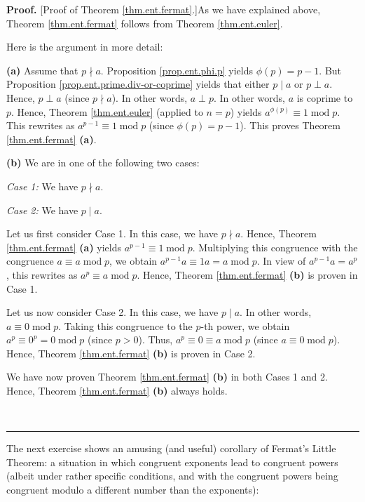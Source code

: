 \documentclass[numbers=enddot,12pt,final,onecolumn,notitlepage]{scrartcl}%
\newcounter{exer}
\numberwithin{exer}{subsection}
\theoremstyle{definition}
\newenvironment{fineprint}{\begin{small}}{\end{small}}
\newenvironment{proof}[1][Proof]{\noindent\textbf{#1.} }{\ \rule{0.5em}{0.5em}}
\begin{document}
\begin{proof}
[Proof of Theorem \ref{thm.ent.fermat}.]As we have explained above, Theorem
\ref{thm.ent.fermat} follows from Theorem \ref{thm.ent.euler}.

\begin{fineprint}
Here is the argument in more detail:

\textbf{(a)} Assume that $p\nmid a$. Proposition \ref{prop.ent.phi.p} yields
$\phi\left(  p\right)  =p-1$. But Proposition
\ref{prop.ent.prime.div-or-coprime} yields that either $p\mid a$ or $p\perp
a$. Hence, $p\perp a$ (since $p\nmid a$). In other words, $a\perp p$. In other
words, $a$ is coprime to $p$. Hence, Theorem \ref{thm.ent.euler} (applied to
$n=p$) yields $a^{\phi\left(  p\right)  }\equiv1\operatorname{mod}p$. This
rewrites as $a^{p-1}\equiv1\operatorname{mod}p$ (since $\phi\left(  p\right)
=p-1$). This proves Theorem \ref{thm.ent.fermat} \textbf{(a)}.

\textbf{(b)} We are in one of the following two cases:

\textit{Case 1:} We have $p\nmid a$.

\textit{Case 2:} We have $p\mid a$.

Let us first consider Case 1. In this case, we have $p\nmid a$. Hence, Theorem
\ref{thm.ent.fermat} \textbf{(a)} yields $a^{p-1}\equiv1\operatorname{mod}p$.
Multiplying this congruence with the congruence $a\equiv a\operatorname{mod}%
p$, we obtain $a^{p-1}a\equiv1a=a\operatorname{mod}p$. In view of
$a^{p-1}a=a^{p}$, this rewrites as $a^{p}\equiv a\operatorname{mod}p$. Hence,
Theorem \ref{thm.ent.fermat} \textbf{(b)} is proven in Case 1.

Let us now consider Case 2. In this case, we have $p\mid a$. In other words,
$a\equiv0\operatorname{mod}p$. Taking this congruence to the $p$-th power, we
obtain $a^{p}\equiv0^{p}=0\operatorname{mod}p$ (since $p>0$). Thus,
$a^{p}\equiv0\equiv a\operatorname{mod}p$ (since $a\equiv0\operatorname{mod}%
p$). Hence, Theorem \ref{thm.ent.fermat} \textbf{(b)} is proven in Case 2.

We have now proven Theorem \ref{thm.ent.fermat} \textbf{(b)} in both Cases 1
and 2. Hence, Theorem \ref{thm.ent.fermat} \textbf{(b)} always holds.
\end{fineprint}
\end{proof}

The next exercise shows an amusing (and useful) corollary of Fermat's Little
Theorem: a situation in which congruent exponents lead to congruent powers
(albeit under rather specific conditions, and with the congruent powers being
congruent modulo a different number than the exponents):
\end{document}
